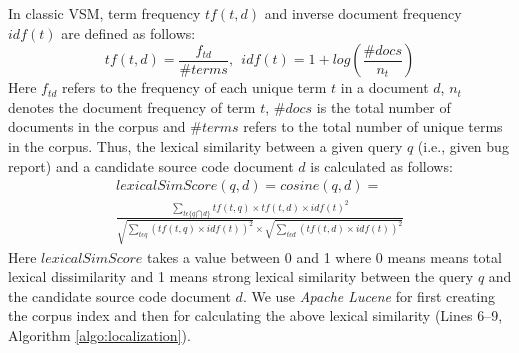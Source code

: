 \documentclass[conference]{IEEEtran}
\begin{document}
In classic VSM, term frequency $tf(t,d)$ and inverse document frequency $idf (t)$ are defined as follows:
\begin{equation*}
tf(t,d)=\frac{f_{td}}{\#terms},~~idf(t)=1+log(\frac{\#docs}{n_{t}})
\end{equation*}
Here $f_{td}$ refers to the frequency of each unique term {$t$} in a document {$d$}, $n_t$ denotes the document frequency of term $t$, $\#docs$ is the total number of documents in the corpus and $\#terms$ refers to the total number of unique terms in the corpus.  
Thus, the lexical similarity between a given query $q$ (i.e., given bug report) and a candidate source code document $d$ is calculated as follows:
\begin{multline*}\label{VSMequation}
lexicalSimScore(q,d)= cosine(q,d) =
\\
\frac{\sum_{t\epsilon \{q\bigcap d\}}tf(t,q)\times tf(t,d)\times idf(t)^{2}
}{\sqrt{\sum_{t\epsilon q}(tf(t,q)\times idf(t))^2}\times
\sqrt{\sum_{t\epsilon d}(tf(t,d)\times idf(t))^2}}
\end{multline*}
Here $lexicalSimScore$ takes a value between 0 and 1 where 0 means means total lexical dissimilarity and 1 means strong lexical similarity between the query $q$ and the candidate source code document $d$. We use \emph{Apache Lucene} for first creating the corpus index and then for calculating the above lexical similarity (Lines 6--9, Algorithm \ref{algo:localization}).
\end{document}
